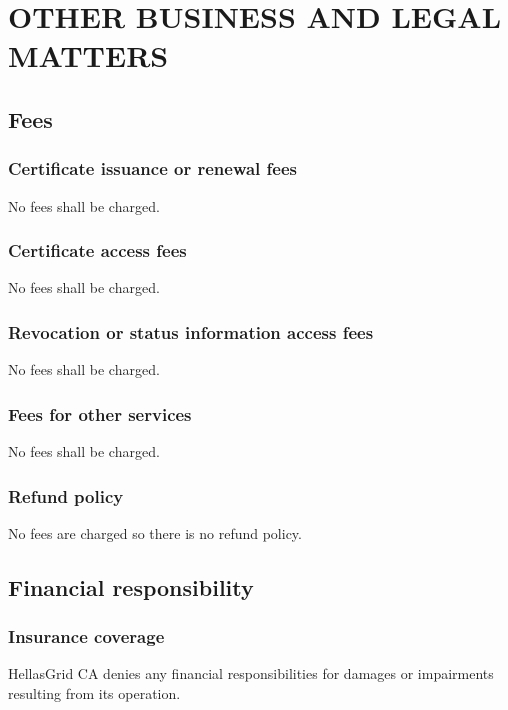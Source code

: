 
\chapter{OTHER BUSINESS AND LEGAL MATTERS}

\section{Fees}
\subsection{Certificate issuance or renewal fees}

No fees shall be charged.

\subsection{Certificate access fees}

No fees shall be charged.

\subsection{Revocation or status information access fees}

No fees shall be charged.

\subsection{Fees for other services}

No fees shall be charged.

\subsection{Refund policy}

No fees are charged so there is no refund policy.

\section{Financial responsibility}

\subsection{Insurance coverage}

HellasGrid CA denies any financial responsibilities for damages or impairments resulting from its operation.

